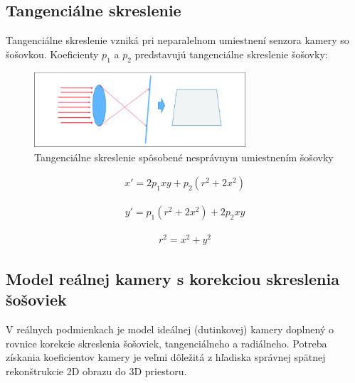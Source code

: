 \subsection{Tangenciálne skreslenie}

Tangenciálne skreslenie vzniká pri neparalelnom umiestnení senzora kamery so šošovkou. Koeficienty $p_1$ a $p_2$ predstavujú tangenciálne skreslenie šošovky:

\begin{figure}[h]
	\centering
	\includegraphics[width=0.7\textwidth]{figures/tangential_distortion.png} 
	\caption{Tangenciálne skreslenie spôsobené nesprávnym umiestnením šošovky}
	\label{fig:tangential_distortion}
\end{figure}

\begin{equation}
\label{eq::tangential_dist::a}
\begin{aligned}
x'= 2p_{1}xy + p_{2}\left(r^{2} + 2x^{2}\right)
\end{aligned}
\end{equation}

\begin{equation}
\label{eq::tangential_dist::b}
\begin{aligned}
y'= p_{1}\left(r^{2} + 2x^{2}\right) + 2p_{2}xy
\end{aligned}
\end{equation}

\begin{equation}
\label{eq::tangential_dist::c}
\begin{aligned}
r^2=x^2+y^2
\end{aligned}
\end{equation}

\subsection{Model reálnej kamery s korekciou skreslenia šošoviek}

V reálnych podmienkach je model ideálnej (dutinkovej) kamery doplnený o rovnice korekcie skreslenia šošoviek, tangenciálneho a radiálneho. Potreba získania koeficientov kamery je veľmi dôležitá z hľadiska správnej spätnej rekonštrukcie 2D obrazu do 3D priestoru.


